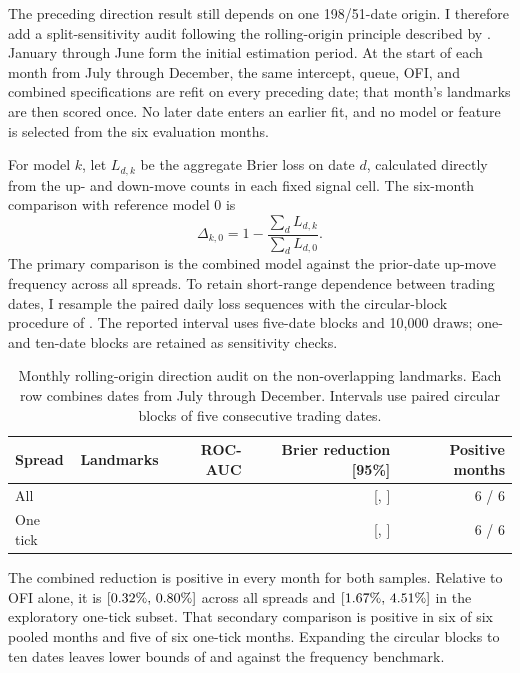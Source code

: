 \documentclass[11pt,a4paper]{article}
\begin{document}
The preceding direction result still depends on one 198/51-date origin. I
therefore add a split-sensitivity audit following the rolling-origin principle
described by \citet{tashman2000}. January through June form the initial
estimation period. At the start of each month from July through December, the
same intercept, queue, OFI, and combined specifications are refit on every
preceding date; that month's landmarks are then scored once. No later date
enters an earlier fit, and no model or feature is selected from the six
evaluation months.

For model $k$, let $L_{d,k}$ be the aggregate Brier loss on date $d$, calculated
directly from the up- and down-move counts in each fixed signal cell. The
six-month comparison with reference model $0$ is
\begin{equation}
  \Delta_{k,0}
    = 1-\frac{\sum_d L_{d,k}}{\sum_d L_{d,0}}.
\end{equation}
The primary comparison is the combined model against the prior-date up-move
frequency across all spreads. To retain short-range dependence between trading
dates, I resample the paired daily loss sequences with the circular-block
procedure of \citet{politis1992}. The reported interval uses five-date blocks
and 10,000 draws; one- and ten-date blocks are retained as sensitivity checks.

\begin{table}[H]
  \centering
  \caption{Monthly rolling-origin direction audit on the non-overlapping
  landmarks. Each row combines \RollingEvaluationDates{} dates from July
  through December. Intervals use paired circular blocks of five consecutive
  trading dates.}
  \label{tab:rolling-landmarks}
  \small
  \begin{tabular}{lrrrr}
    \toprule
    Spread & Landmarks & ROC-AUC & Brier reduction [95\%] & Positive months \\
    \midrule
    All & \RollingAllObservations{} & \RollingAllAuc{} &
      \RollingAllBrierReduction{} [\RollingAllBrierLower{},
      \RollingAllBrierUpper{}] & 6 / 6 \\
    One tick & \RollingOneTickObservations{} & \RollingOneTickAuc{} &
      \RollingOneTickBrierReduction{} [\RollingOneTickBrierLower{},
      \RollingOneTickBrierUpper{}] & 6 / 6 \\
    \bottomrule
  \end{tabular}
\end{table}

The combined reduction is positive in every month for both samples. Relative
to OFI alone, it is \RollingAllVsOfi{}
$[0.32\%{},\,0.80\%{}]$ across all spreads and
\RollingOneTickVsOfi{}
$[1.67\%{},\,4.51\%{}]$ in the exploratory
one-tick subset. That secondary comparison is positive in six of six pooled
months and five of six one-tick months. Expanding the circular blocks to ten
dates leaves lower bounds of \RollingAllTenDayLower{} and
\RollingOneTickTenDayLower{} against the frequency benchmark.
\end{document}
